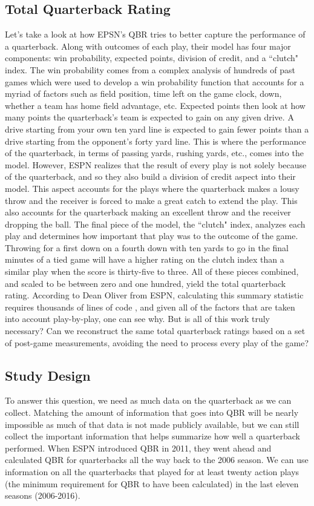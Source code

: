 \documentclass[12pt]{article}\usepackage[]{graphicx}\usepackage[]{color}
\begin{document}
\subsection{Total Quarterback Rating}
Let's take a look at how EPSN's QBR tries to better capture the performance of a quarterback. Along with outcomes of each play, their model has four major components: win probability, expected points, division of credit, and a ``clutch" index. The win probability comes from a complex analysis of hundreds of past games which were used to develop a win probability function that accounts for a myriad of factors such as field position, time left on the game clock, down, whether a team has home field advantage, etc. Expected points then look at how many points the quarterback's team is expected to gain on any given drive. A drive starting from your own ten yard line is expected to gain fewer points than a drive starting from the opponent's forty yard line. This is where the performance of the quarterback, in terms of passing yards, rushing yards, etc., comes into the model. However, ESPN realizes that the result of every play is not solely because of the quarterback, and so they also build a division of credit aspect into their model. This aspect accounts for the plays where the quarterback makes a lousy throw and the receiver is forced to make a great catch to extend the play. This also accounts for the quarterback making an excellent throw and the receiver dropping the ball. The final piece of the model, the ``clutch" index, analyzes each play and determines how important that play was to the outcome of the game. Throwing for a first down on a fourth down with ten yards to go in the final minutes of a tied game will have a higher rating on the clutch index than a similar play when the score is thirty-five to three. All of these pieces combined, and scaled to be between zero and one hundred, yield the total quarterback rating. According to Dean Oliver from ESPN, calculating this summary statistic requires thousands of lines of code \cite{qbr1}, and given all of the factors that are taken into account play-by-play, one can see why. But is all of this work truly necessary? Can we reconstruct the same total quarterback ratings based on a set of post-game measurements, avoiding the need to process every play of the game?

\subsection{Study Design}
To answer this question, we need as much data on the quarterback as we can collect. Matching the amount of information that goes into QBR will be nearly impossible as much of that data is not made publicly available, but we can still collect the important information that helps summarize how well a quarterback performed. When ESPN introduced QBR in 2011, they went ahead and calculated QBR for quarterbacks all the way back to the 2006 season. We can use information on all the quarterbacks that played for at least twenty action plays (the minimum requirement for QBR to have been calculated) in the last eleven seasons (2006-2016).
\end{document}
